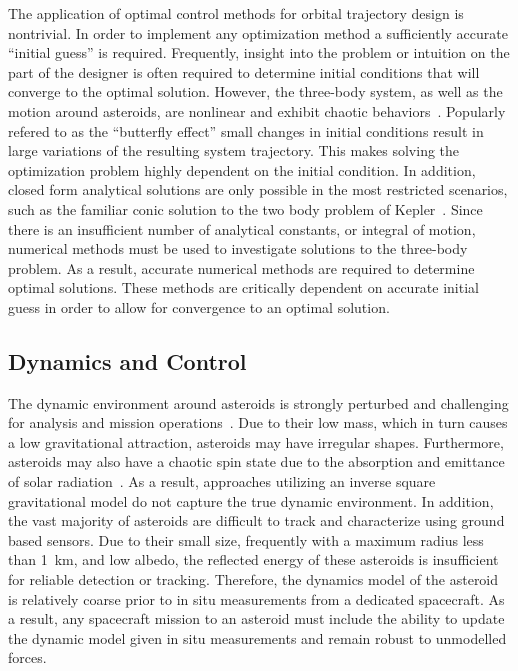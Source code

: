 The application of optimal control methods for orbital trajectory design is nontrivial.
In order to implement any optimization method a sufficiently accurate ``initial guess'' is required.
Frequently, insight into the problem or intuition on the part of the designer is often required to determine initial conditions that will converge to the optimal solution.
However, the three-body system, as well as the motion around asteroids, are nonlinear and exhibit chaotic behaviors~\cite{scheeres2012a,szebehely1967}.
Popularly refered to as the ``butterfly effect'' small changes in initial conditions result in large variations of the resulting system trajectory. 
This makes solving the optimization problem highly dependent on the initial condition.
In addition, closed form analytical solutions are only possible in the most restricted scenarios, such as the familiar conic solution to the two body problem of Kepler~\cite{bate1971}.
Since there is an insufficient number of analytical constants, or integral of motion, numerical methods must be used to investigate solutions to the three-body problem.
As a result, accurate numerical methods are required to determine optimal solutions.
These methods are critically dependent on accurate initial guess in order to allow for convergence to an optimal solution.

\subsection{Dynamics and Control}

The dynamic environment around asteroids is strongly perturbed and challenging for analysis and mission operations~\cite{scheeres2012}.
Due to their low mass, which in turn causes a low gravitational attraction, asteroids may have irregular shapes.
Furthermore, asteroids may also have a chaotic spin state due to the absorption and emittance of solar radiation~\cite{rubincam2000}.
As a result, approaches utilizing an inverse square gravitational model do not capture the  true dynamic environment.
In addition, the vast majority of asteroids are difficult to track and characterize using ground based sensors.
Due to their small size, frequently with a maximum radius less than \SI{1}{\kilo\meter}, and low albedo, the reflected energy of these asteroids is insufficient for reliable detection or tracking.
Therefore, the dynamics model of the asteroid is relatively coarse prior to in situ measurements from a dedicated spacecraft.
As a result, any spacecraft mission to an asteroid must include the ability to update the dynamic model given in situ measurements and remain robust to unmodelled forces.

